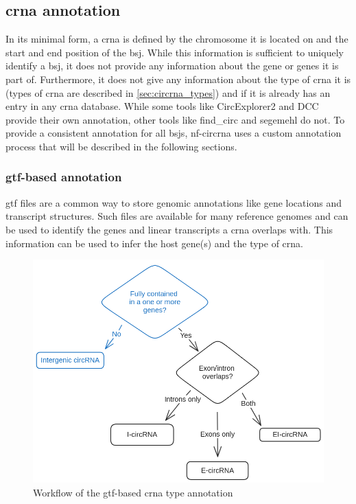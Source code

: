 \subsection{\gls{crna} annotation}
In its minimal form, a \gls{crna} is defined by the chromosome it is located on
and the start and end position of the \gls{bsj}.
While this information is sufficient to uniquely identify a \gls{bsj}, it does
not provide any information about the gene or genes it is part of.
Furthermore, it does not give any information about the type of \gls{crna} it
is (types of \gls{crna} are described in \cref{sec:circrna_types}) and if it is
already has an entry in any \gls{crna} database.
While some tools like CircExplorer2 and DCC provide their own annotation, other
tools like find\_circ and segemehl do not.
To provide a consistent annotation for all \glspl{bsj}, \gls{nf-circrna} uses a
custom annotation process that will be described in the following sections.

\subsubsection{\gls{gtf}-based annotation}
\label{sec:gtf_annotation}
\gls{gtf} files are a common way to store genomic annotations like gene
locations and
transcript structures.
Such files are available for many reference genomes and can be used to identify
the genes and linear transcripts a \gls{crna} overlaps with.
This information can be used to infer the host gene(s) and the type of
\gls{crna}.

\begin{figure}[ht]
    \centering

    \includegraphics[width=\textwidth]{chapters/3_materials_and_methods/figures/annotation.png}
    \caption{Workflow of the \gls{gtf}-based \gls{crna} type annotation}
    \label{fig:gtf_annotation}
\end{figure}

